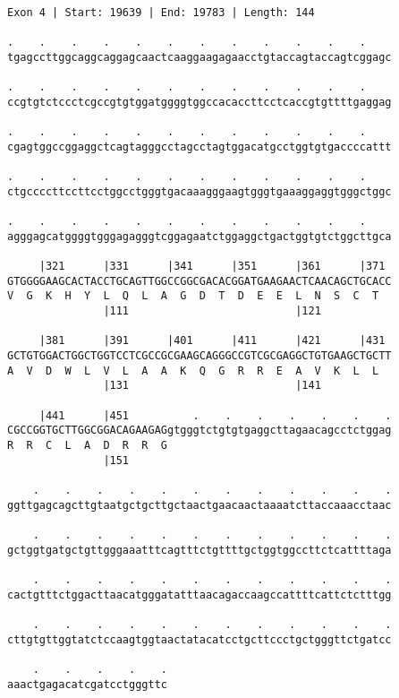 \documentclass{article}
\begin{document}
\newpage
\begin{Verbatim}[fontfamily=courier]
Exon 4 | Start: 19639 | End: 19783 | Length: 144

.    .    .    .    .    .    .    .    .    .    .    .    
tgagccttggcaggcaggagcaactcaaggaagagaacctgtaccagtaccagtcggagc

.    .    .    .    .    .    .    .    .    .    .    .    
ccgtgtctccctcgccgtgtggatggggtggccacaccttcctcaccgtgttttgaggag

.    .    .    .    .    .    .    .    .    .    .    .    
cgagtggccggaggctcagtagggcctagcctagtggacatgcctggtgtgaccccattt

.    .    .    .    .    .    .    .    .    .    .    .    
ctgccccttccttcctggcctgggtgacaaagggaagtgggtgaaaggaggtgggctggc

.    .    .    .    .    .    .    .    .    .    .    .    
agggagcatggggtgggagagggtcggagaatctggaggctgactggtgtctggcttgca

     |321      |331      |341      |351      |361      |371 
GTGGGGAAGCACTACCTGCAGTTGGCCGGCGACACGGATGAAGAACTCAACAGCTGCACC
V  G  K  H  Y  L  Q  L  A  G  D  T  D  E  E  L  N  S  C  T  
               |111                          |121           

     |381      |391      |401      |411      |421      |431 
GCTGTGGACTGGCTGGTCCTCGCCGCGAAGCAGGGCCGTCGCGAGGCTGTGAAGCTGCTT
A  V  D  W  L  V  L  A  A  K  Q  G  R  R  E  A  V  K  L  L  
               |131                          |141           

     |441      |451          .    .    .    .    .    .    .
CGCCGGTGCTTGGCGGACAGAAGAGgtgggtctgtgtgaggcttagaacagcctctggag
R  R  C  L  A  D  R  R  G                                   
               |151                                         

    .    .    .    .    .    .    .    .    .    .    .    .
ggttgagcagcttgtaatgctgcttgctaactgaacaactaaaatcttaccaaacctaac

    .    .    .    .    .    .    .    .    .    .    .    .
gctggtgatgctgttgggaaatttcagtttctgttttgctggtggccttctcattttaga

    .    .    .    .    .    .    .    .    .    .    .    .
cactgtttctggacttaacatgggatatttaacagaccaagccattttcattctctttgg

    .    .    .    .    .    .    .    .    .    .    .    .
cttgtgttggtatctccaagtggtaactatacatcctgcttccctgctgggttctgatcc

    .    .    .    .    .
aaactgagacatcgatcctgggttc
\end{Verbatim}
\end{document}
